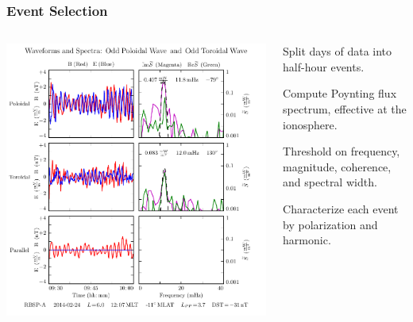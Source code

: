 \documentclass{beamer}
\begin{document}

\begin{frame}
\frametitle{Event Selection}

\begin{columns}
\includegraphics[width=\textwidth]{figures/sample_event_phase.pdf}
\begin{wideitemize}
\item Split  days of data into half-hour events. 
\item Compute Poynting flux spectrum, effective at the ionosphere. 
\item Threshold on frequency, magnitude, coherence, and spectral width. 
\item Characterize each event by polarization and harmonic. 
\end{wideitemize}
\end{columns}

\end{frame}

\end{document}
